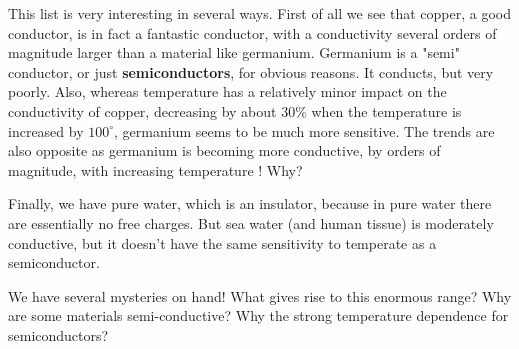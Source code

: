 \noindent
This list is very interesting in several ways.  First of all we see that copper, a good conductor, is in fact a fantastic conductor, with a conductivity several orders of magnitude larger than a material like germanium.  Germanium is a "semi" conductor, or just \textbf{semiconductors}, for obvious reasons.  It conducts, but very poorly.  Also, whereas temperature has a relatively minor impact on the conductivity of copper, decreasing by about 30\% when the temperature is increased by $100^\circ$, germanium seems to be much more sensitive.  The trends are also opposite as germanium is becoming more conductive, by orders of magnitude, with increasing temperature !  Why?

Finally, we have pure water, which is an insulator, because in pure water there are essentially no free charges.  But sea water (and human tissue) is moderately conductive, but it doesn't have the same sensitivity to temperate as a semiconductor.

We have several mysteries on hand!  What gives rise to this enormous range?  Why are some materials semi-conductive?  Why the strong temperature dependence for semiconductors?
